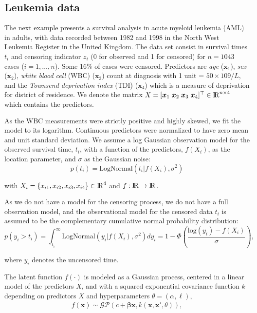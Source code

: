 \documentclass[onecolumn,a4paper,11pt]{article}
\begin{document}
\subsection{Leukemia data}\label{ch5_sec_bf_caseVI}
The next example presents a survival analysis in acute myeloid leukemia (AML) in adults, with data recorded between 1982 and 1998 in the North West Leukemia Register in the United Kingdom. The data set consist in survival times $t_i$ and censoring indicator $z_i$ (0 for observed and 1 for censored) for $n=1043$ cases ($i=1,\dots,n$). Some 16\% of cases were censored. Predictors are \textit{age} ($\bm{x}_1$), \textit{sex} ($\bm{x}_2$), \textit{white blood cell} (WBC) ($\bm{x}_3$) count at diagnosis with 1 unit = $50\times109/L$, and the \textit{Townsend deprivation index} (TDI) ($\bm{x}_4$) which is a measure of deprivation for district of residence. We denote the matrix $X=[\bm{x}_1\; \bm{x}_2 \; \bm{x}_3 \; \bm{x}_4]^\top \in {\rm I\!R}^{n\times 4}$ which contains the predictors.

As the WBC measurements were strictly positive and highly skewed, we fit the model to its logarithm. Continuous predictors were normalized to have zero mean and unit standard deviation. %
We assume a log Gaussian observation model for the observed survival time, $t_i$, with a function of the predictors, $f(X_i)$, as the location parameter, and $\sigma$ as the Gaussian noise: 
%
\begin{equation*}
p(t_i)= \mathrm{LogNormal}(t_i|f(X_i),\sigma^2)
\end{equation*}

\noindent with $X_i=\{x_{i1},x_{i2},x_{i3},x_{i4}\} \in {\rm I\!R}^4$ and $f:{\rm I\!R} \to {\rm I\!R}$.

As we do not have a model for the censoring process, we do not have a full observation model, and the observational model for the censored data $t_i$ is assumed to be the complementary cumulative normal probability distribution:
%
\begin{equation*}
p(y_i > t_i)= \int_{t_i}^{\infty} \mathrm{LogNormal}(y_i|f(X_i),\sigma^2) dy_i=  1 - \Phi \left( \frac{\mathrm{log}(y_i)-f(X_i)}{\sigma} \right),
\end{equation*}

\noindent where $y_i$ denotes the uncensored time.

The latent function $f(\cdot)$ is modeled as a Gaussian process, centered in a linear model of the predictors $X$, and with a squared exponential covariance function $k$ depending on predictors $X$ and hyperparameters $\theta=(\alpha,\ell)$,
%
\begin{eqnarray*} 
f(\bm{x}) \sim \mathcal{GP}(c + \bm{\beta}\bm{x}, k(\bm{x},\bm{x}', \theta)),
\end{eqnarray*}
\end{document}

